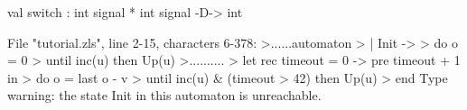 \chklistingtrue
{}
\begin{ChkListingMsg}
val switch : int signal * int signal -D-> int
\end{ChkListingMsg}
\begin{ChkListingErr}
File "tutorial.zls", line 2-15, characters 6-378:
>......automaton
>  | Init ->
>      do o = 0
>      until inc(u) then Up(u)
>..........
>      let rec timeout = 0 -> pre timeout + 1 in
>      do o = last o - v
>      until inc(u) & (timeout > 42) then Up(u)
>  end
Type warning: the state Init in this automaton is unreachable.
\end{ChkListingErr}
